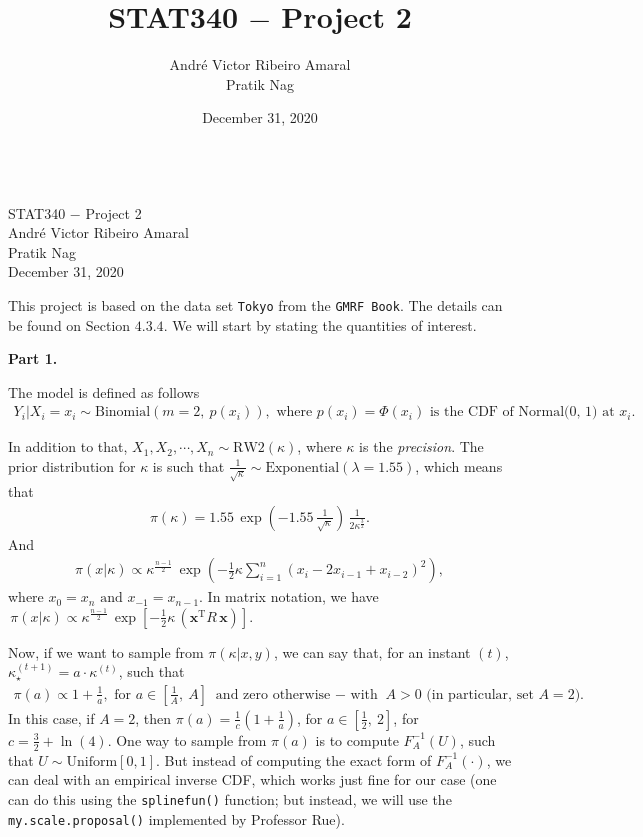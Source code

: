 \documentclass[12pt]{article}\usepackage[]{graphicx}\usepackage[]{color}
\title{STAT340 $-$ Project 2}
\author{André Victor Ribeiro Amaral \\ Pratik Nag}
\date{December 31, 2020}
\begin{document}
\begin{center}
\phantom{A} \\ \vspace{5cm}
\huge{STAT340 $-$ Project 2} \\ \vspace{24pt}
\LARGE{André Victor Ribeiro Amaral \\ Pratik Nag} \\ \vspace{12cm}
\large{December 31, 2020}
\end{center}

\newpage

This project is based on the data set \texttt{Tokyo} from the \texttt{GMRF Book}. The details can be found on Section $4.3.4$. We will start by stating the quantities of interest.

\textbf{Part 1.}

The model is defined as follows
\begin{align*}
Y_i|X_i = x_i \sim \text{Binomial}(m = 2, ~p(x_i)), \text{ where } p(x_i) = \Phi(x_i) \text{ is the CDF of Normal(0,~1) at } x_i.
\end{align*}

In addition to that, $X_1, X_2, \cdots, X_n \sim \text{RW}2(\kappa)$, where $\kappa$ is the \textit{precision}. The prior distribution for $\kappa$ is such that $\frac{1}{\sqrt{\kappa}} \sim \text{Exponential}(\lambda = 1.55)$, which means that
\begin{align*}
\pi(\kappa) = 1.55 \, \exp\left(-1.55 \, \frac{1}{\sqrt{\kappa}}\right) \, \frac{1}{2 \kappa^{\frac{3}{2}}}.
\end{align*}
And
\begin{align*}
\pi(x|\kappa) \propto \kappa^{\frac{n - 1}{2}} \, \exp\left(-\frac{1}{2} \kappa \sum_{i = 1}^{n} (x_i - 2x_{i-1} + x_{i-2})^2\right),
\end{align*}
where $x_0 = x_n \text{ and } x_{-1} = x_{n-1}$. In matrix notation, we have $\,\pi(x|\kappa) \propto \kappa^{\frac{n - 1}{2}} \, \exp\left[-\frac{1}{2} \kappa \, (\boldsymbol{x}^{\text{T}} R \, \boldsymbol{x}) \right]$.

Now, if we want to sample from $\pi(\kappa|x, y)$, we can say that, for an instant $(t)$, $\kappa_{\star}^{(t + 1)} = a \cdot \kappa^{(t)}$, such that
\begin{align*}
\pi(a) \propto 1 + \frac{1}{a}, \text{ for } a \in \left[\frac{1}{A}, ~A\right] \text{ and zero otherwise $-$ with } A > 0 \text{ (in particular, set } A = 2 \text{)}. 
\end{align*}
In this case, if $A = 2$, then $\pi(a) = \frac{1}{c}\left(1 + \frac{1}{a}\right)$, for $a \in \left[\frac{1}{2}, ~2\right]$, for $c = \frac{3}{2} + \ln(4)$. One way to sample from $\pi(a)$ is to compute $F_A^{-1}(U)$, such that $U \sim \text{Uniform}[0, 1]$. But instead of computing the exact form of $F_A^{-1}(\cdot)$, we can deal with an empirical inverse CDF, which works just fine for our case (one can do this using the \texttt{splinefun()} function; but instead, we will use the \texttt{my.scale.proposal()} implemented by Professor Rue).
\end{document}
